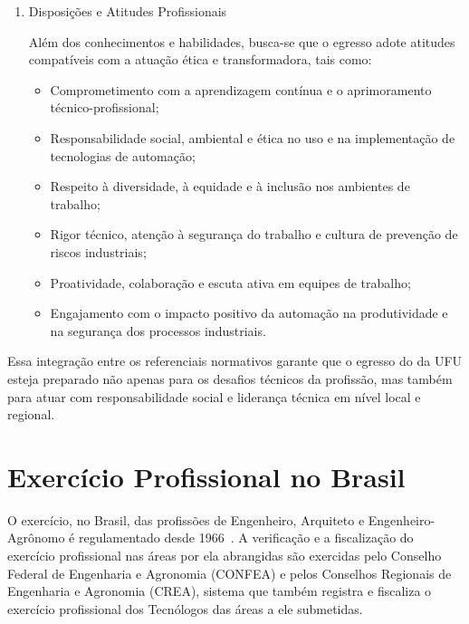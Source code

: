 \begin{enumerate}[label=\Roman*.]
\item Disposições e Atitudes Profissionais~\cite{cne_cp_1_2021}

Além dos conhecimentos e habilidades, busca-se que o egresso adote atitudes compatíveis com a atuação ética e transformadora, tais como:

\begin{itemize}
    \item Comprometimento com a aprendizagem contínua e o aprimoramento técnico-profissional;
    \item Responsabilidade social, ambiental e ética no uso e na implementação de tecnologias de automação;
    \item Respeito à diversidade, à equidade e à inclusão nos ambientes de trabalho;
    \item Rigor técnico, atenção à segurança do trabalho e cultura de prevenção de riscos industriais;
    \item Proatividade, colaboração e escuta ativa em equipes de trabalho;
    \item Engajamento com o impacto positivo da automação na produtividade e na segurança dos processos industriais.
\end{itemize}
\end{enumerate}

Essa integração entre os referenciais normativos garante que o egresso do \ppccurso da UFU esteja preparado não apenas para os desafios técnicos da profissão, mas também para atuar com responsabilidade social e liderança técnica em nível local e regional.

\section{Exercício Profissional no Brasil}
\label{sec:exercicio_profissional}

O exercício, no Brasil, das profissões de Engenheiro, Arquiteto e Engenheiro-Agrônomo é regulamentado desde 1966~\cite{brasil_lei_5194_1966}. A verificação e a fiscalização do exercício profissional nas áreas por ela abrangidas são exercidas pelo Conselho Federal de Engenharia e Agronomia (CONFEA) e pelos Conselhos Regionais de Engenharia e Agronomia (CREA), sistema que também registra e fiscaliza o exercício profissional dos Tecnólogos das áreas a ele submetidas.

